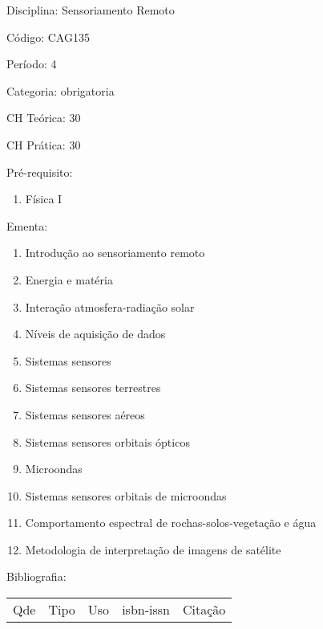 \documentclass[12pt,a4paper,twoside]{report}
\begin{document}
Disciplina: Sensoriamento Remoto

Código: CAG135

Período: 4

Categoria: obrigatoria

CH Teórica: 30

CH Prática: 30




Pré-requisito:
\begin{enumerate}
\item Física I
\end{enumerate}

Ementa:
\begin{enumerate}
\item Introdução ao sensoriamento remoto
\item Energia e matéria
\item Interação atmosfera-radiação solar
\item Níveis de aquisição de dados
\item Sistemas sensores
\item Sistemas sensores terrestres
\item Sistemas sensores aéreos
\item Sistemas sensores orbitais ópticos
\item Microondas
\item Sistemas sensores orbitais de microondas
\item Comportamento espectral de rochas-solos-vegetação e água
\item Metodologia de interpretação de imagens de satélite
\end{enumerate}



Bibliografia:


\begin{tabular}{llllp{8cm}}
Qde & Tipo & Uso & isbn-issn & Citação \\
\end{tabular}
\end{document}
